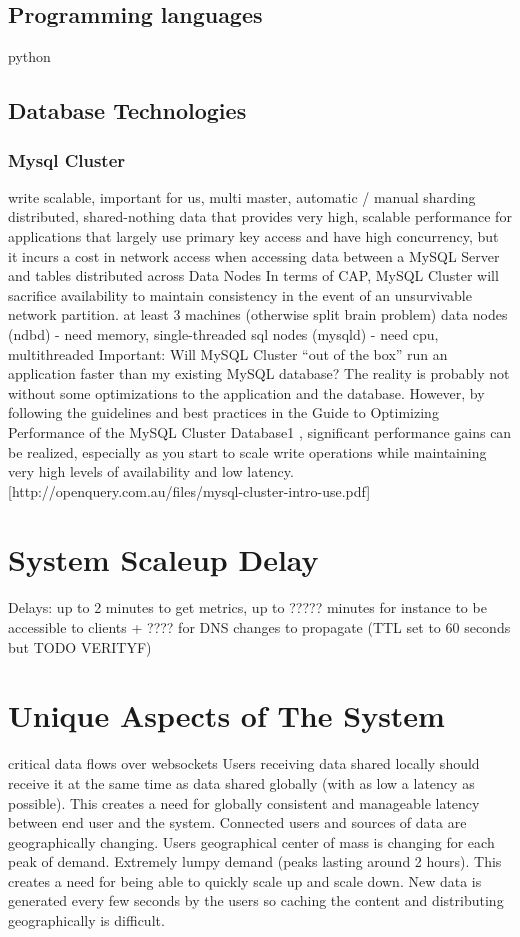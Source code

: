 \documentclass{uvamscse}
\begin{document}
\subsection{Programming languages}

python

\subsection{Database Technologies}

\subsubsection{Mysql Cluster}
write scalable, important for us, multi master, automatic / manual sharding
distributed, shared-nothing data that provides very high, scalable performance for applications that largely use primary key access and have high concurrency, but it incurs a cost in network access when accessing data between a MySQL Server and tables distributed across Data Nodes
In terms of CAP, MySQL Cluster will sacrifice availability to maintain consistency in the event of an unsurvivable network partition.
at least 3 machines (otherwise split brain problem)
data nodes (ndbd) - need memory, single-threaded
sql nodes (mysqld) - need cpu, multithreaded
Important:
Will MySQL Cluster “out of the box” run an application faster than my existing MySQL database?
The reality is probably not without some optimizations to the application and the database. However, by following the guidelines and best practices in the Guide to Optimizing Performance of the MySQL Cluster Database1 , significant performance gains can be realized, especially as you start to scale write operations while maintaining very high levels of availability and low latency.
[http://openquery.com.au/files/mysql-cluster-intro-use.pdf]


\section{System Scaleup Delay}
Delays: up to 2 minutes to get metrics, up to ????? minutes for instance to be accessible to clients + ???? for DNS changes to propagate (TTL set to 60 seconds but TODO VERITYF)

\section{Unique Aspects of The System}
critical data flows over websockets
Users receiving data shared locally should receive it at the same time as data shared globally (with as low a latency as possible). This creates a need for globally consistent and manageable latency between end user and the system.
Connected users and sources of data are geographically changing.
Users geographical center of mass is changing for each peak of demand.
Extremely lumpy demand (peaks lasting around 2 hours). This creates a need for being able to quickly scale up and scale down.
New data is generated every few seconds by the users so caching the content and distributing geographically is difficult.
\end{document}
